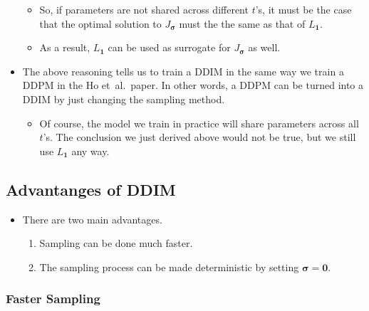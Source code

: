 \documentclass[10pt]{article}
\newcommand{\ve}[1]{\mathbf{#1}}
\newcommand{\ves}[1]{\boldsymbol{#1}}
\newcommand{\etal}{{et~al.}}
\begin{document}
\begin{itemize}
\begin{itemize}
    \item So, if parameters are not shared across different $t$'s, it must be the case that the optimal solution to $J_{\ves{\sigma}}$ must the the same as that of $L_{\ve{1}}$.
    
    \item As a result, $L_{\ve{1}}$ can be used as surrogate for $J_{\ves{\sigma}}$ as well.
  \end{itemize}

  \item The above reasoning tells us to train a DDIM in the same way we train a DDPM in the Ho \etal\ paper. In other words, a DDPM can be turned into a DDIM by just changing the sampling method.
  \begin{itemize}
    \item Of course, the model we train in practice will share parameters across all $t$'s. The conclusion we just derived above would not be true, but we still use $L_{\ve{1}}$ any way.
  \end{itemize}
\end{itemize}

\subsection{Advantanges of DDIM}

\begin{itemize}
  \item There are two main advantages.
  \begin{enumerate}
    \item Sampling can be done much faster.
    \item The sampling process can be made deterministic by setting $\ves{\sigma} = \ve{0}$.
  \end{enumerate}
\end{itemize}

\subsubsection{Faster Sampling}
\end{document}
